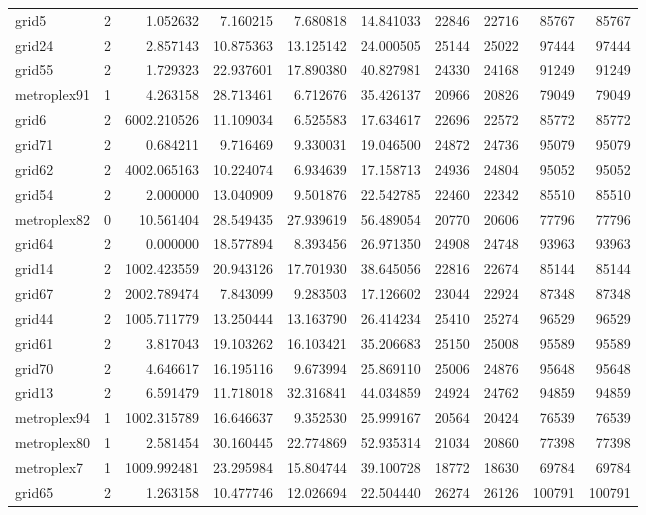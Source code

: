 \begin{longtable}{|l|r|r|r|r|r|r|r|r|r|}
grid5 & 2 & 1.052632 & 7.160215 & 7.680818 & 14.841033 & 22846 & 22716 & 85767 & 85767 \\
grid24 & 2 & 2.857143 & 10.875363 & 13.125142 & 24.000505 & 25144 & 25022 & 97444 & 97444 \\
grid55 & 2 & 1.729323 & 22.937601 & 17.890380 & 40.827981 & 24330 & 24168 & 91249 & 91249 \\
metroplex91 & 1 & 4.263158 & 28.713461 & 6.712676 & 35.426137 & 20966 & 20826 & 79049 & 79049 \\
grid6 & 2 & 6002.210526 & 11.109034 & 6.525583 & 17.634617 & 22696 & 22572 & 85772 & 85772 \\
grid71 & 2 & 0.684211 & 9.716469 & 9.330031 & 19.046500 & 24872 & 24736 & 95079 & 95079 \\
grid62 & 2 & 4002.065163 & 10.224074 & 6.934639 & 17.158713 & 24936 & 24804 & 95052 & 95052 \\
grid54 & 2 & 2.000000 & 13.040909 & 9.501876 & 22.542785 & 22460 & 22342 & 85510 & 85510 \\
metroplex82 & 0 & 10.561404 & 28.549435 & 27.939619 & 56.489054 & 20770 & 20606 & 77796 & 77796 \\
grid64 & 2 & 0.000000 & 18.577894 & 8.393456 & 26.971350 & 24908 & 24748 & 93963 & 93963 \\
grid14 & 2 & 1002.423559 & 20.943126 & 17.701930 & 38.645056 & 22816 & 22674 & 85144 & 85144 \\
grid67 & 2 & 2002.789474 & 7.843099 & 9.283503 & 17.126602 & 23044 & 22924 & 87348 & 87348 \\
grid44 & 2 & 1005.711779 & 13.250444 & 13.163790 & 26.414234 & 25410 & 25274 & 96529 & 96529 \\
grid61 & 2 & 3.817043 & 19.103262 & 16.103421 & 35.206683 & 25150 & 25008 & 95589 & 95589 \\
grid70 & 2 & 4.646617 & 16.195116 & 9.673994 & 25.869110 & 25006 & 24876 & 95648 & 95648 \\
grid13 & 2 & 6.591479 & 11.718018 & 32.316841 & 44.034859 & 24924 & 24762 & 94859 & 94859 \\
metroplex94 & 1 & 1002.315789 & 16.646637 & 9.352530 & 25.999167 & 20564 & 20424 & 76539 & 76539 \\
metroplex80 & 1 & 2.581454 & 30.160445 & 22.774869 & 52.935314 & 21034 & 20860 & 77398 & 77398 \\
metroplex7 & 1 & 1009.992481 & 23.295984 & 15.804744 & 39.100728 & 18772 & 18630 & 69784 & 69784 \\
grid65 & 2 & 1.263158 & 10.477746 & 12.026694 & 22.504440 & 26274 & 26126 & 100791 & 100791 \\

\end{longtable}
